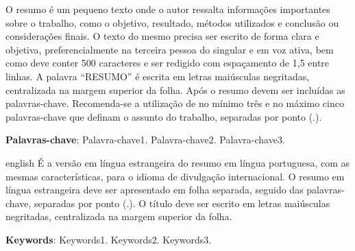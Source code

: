 

\begin{resumonew}

O resumo é um pequeno texto onde o autor ressalta informações importantes sobre o
trabalho, como o objetivo, resultado, métodos utilizados e conclusão ou considerações finais.
O texto do mesmo precisa ser escrito de forma clara e objetiva, preferencialmente na terceira
pessoa do singular e em voz ativa, bem como deve conter 500 caracteres e ser redigido com espaçamento de 1,5 entre linhas.
A palavra “RESUMO” é escrita em letras maiúsculas negritadas, centralizada na margem
superior da folha.
Após o resumo devem ser incluídas as palavras-chave. Recomenda-se a utilização de no
mínimo três e no máximo cinco palavras-chave que definam o assunto do trabalho, separadas
por ponto (.).

 \vspace{\onelineskip}
 \noindent
 \textbf{Palavras-chave}: Palavra-chave1. Palavra-chave2. Palavra-chave3. 
\end{resumonew}

\begin{resumoabstract}[\resumonameeng]
 \begin{otherlanguage*}{english}
   É a versão em língua estrangeira do resumo em língua portuguesa, com as mesmas características, para o idioma de divulgação internacional. O resumo em língua estrangeira deve ser apresentado em folha separada, seguido das palavras-chave, separadas por ponto (.). 
   O título deve ser escrito em letras maiúsculas negritadas, centralizada na margem superior da folha. 


   \vspace{\onelineskip}
   \noindent 
   \textbf{Keywords}: Keywords1. Keywords2. Keywords3.
 \end{otherlanguage*}
\end{resumoabstract}

